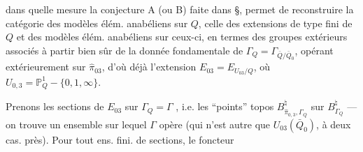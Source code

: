dans quelle mesure la conjecture A
(ou B) faite dans  §, permet de
reconstruire la catégorie des modèles élém.
anabéliens sur $Q$,  celle des extensions
de type fini de $Q$ et des modèles
élém. anabéliens sur ceux-ci, en
termes des groupes extérieurs  associés
à partir bien sûr de la donnée
fondamentale de $\Gamma_Q=\Gamma_{\bar Q/\bar Q_0}$, opérant
extérieurement sur $\widehat\pi_{03}$, d'où déjà
l'extension $E_{03}=E_{U_{03}/Q}$, où
$U_{0,3}=\mathbb P^1_Q-\{0,1,\infty\}$.

Prenons les  sections de $E_{03}$ sur $\Gamma_Q=\Gamma$
,
i.e. les ``points''   topos $B_{\widehat\pi_{0,3},\Gamma_Q}^{\natural}$ sur
$B_{\Gamma_Q}^{\natural}$ — on trouve un ensemble sur
lequel $\Gamma$ opère (qui n'est autre que
$U_{03}(\bar Q_0)$, à deux cas. près). Pour
tout ens. fini.  de sections,  le foncteur
